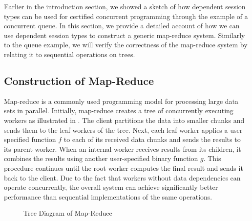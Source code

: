 Earlier in the introduction section, we showed a sketch of how dependent session types
can be used for certified concurrent programming through the example of a concurrent queue.
In this section, we provide a detailed account of how we can use dependent session types
to construct a generic map-reduce system. Similarly to the queue example, we will verify
the correctness of the map-reduce system by relating it to sequential operations on trees.

\subsection{Construction of Map-Reduce}
Map-reduce is a commonly used programming model for processing large data sets in parallel.
Initially, map-reduce creates a tree of concurrently executing workers as illustrated in
. The client partitions the data into smaller chunks and sends them to
the leaf workers of the tree. Next, each leaf worker applies a user-specified
function $f$ to each of its received data chunks and sends the results to its parent worker.
When an internal worker receives results from its children, it combines the results using another
user-specified binary function $g$. This procedure continues until the root worker computes
the final result and sends it back to the client. Due to the fact that workers without
data dependencies can operate concurrently, the overall system can achieve significantly better
performance than sequential implementations of the same operations.
\vspace{-0.3em}
\begin{figure}[H]
\vspace{-0.8em}
\caption{Tree Diagram of Map-Reduce}
\label{fig:map-reduce}
\end{figure}
\vspace{-0.8em}

